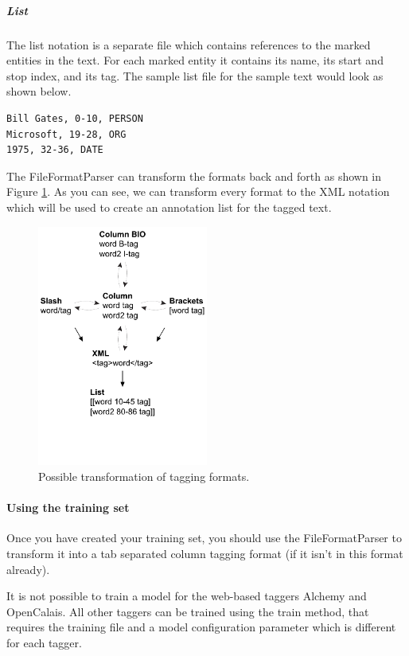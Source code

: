 \subparagraph{List} The list notation is a separate file which contains references to the marked entities in the text. For each marked entity it contains its name, its start and stop index, and its tag. The sample list file for the sample text would look as shown below.

\begin{verbatim}
Bill Gates, 0-10, PERSON
Microsoft, 19-28, ORG
1975, 32-36, DATE
\end{verbatim}

The FileFormatParser can transform the formats back and forth as shown in Figure \ref{fig:taggingFormats}. As you can see, we can transform every format to the XML notation which will be used to create an annotation list for the tagged text.

\begin{figure}[ht!]
\centering
\includegraphics[width=0.5\textwidth]{img/taggingFormats.pdf}
\caption{Possible transformation of tagging formats.}
\label{fig:taggingFormats}
\end{figure}

\paragraph{Using the training set}
Once you have created your training set, you should use the FileFormatParser to transform it into a tab separated column tagging format (if it isn't in this format already).

It is not possible to train a model for the web-based taggers Alchemy and OpenCalais. All other taggers can be trained using the train method, that requires the training file and a model configuration parameter which is different for each tagger.


